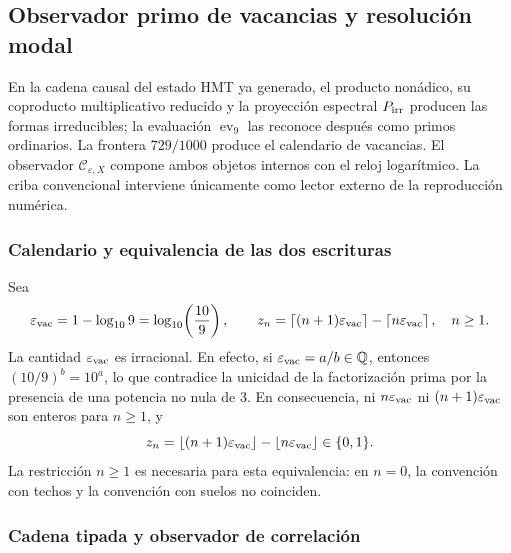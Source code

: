 \subsection{Observador primo de vacancias y resoluci\'on modal}
\label{sec:f051-prime-vacancy-observer}

En la cadena causal del estado HMT ya generado, el producto non\'adico, su
coproducto multiplicativo reducido y la proyecci\'on espectral
\(P_{\rm irr}\) producen las formas irreducibles; la evaluaci\'on
\(\operatorname{ev}_9\) las reconoce despu\'es como primos ordinarios. La
frontera \(729/1000\) produce el calendario de vacancias. El observador
\(\mathcal C_{\varepsilon,X}\) compone ambos objetos internos con el reloj
logar\'itmico. La criba convencional interviene únicamente como lector
externo de la reproducci\'on num\'erica.

\subsubsection{Calendario y equivalencia de las dos escrituras}

Sea
\begin{equation}
 \varepsilon_{\rm vac}
 =1-\log_{10}9
 =\log_{10}\!\left(\frac{10}{9}\right),
 \qquad
 z_n=\left\lceil(n+1)\varepsilon_{\rm vac}\right\rceil
      -\left\lceil n\varepsilon_{\rm vac}\right\rceil ,
 \quad n\geq1.
 \label{eq:f051-epsilon-calendar}
\end{equation}
La cantidad \(\varepsilon_{\rm vac}\) es irracional. En efecto, si
\(\varepsilon_{\rm vac}=a/b\in\mathbb Q\), entonces
\((10/9)^b=10^a\), lo que contradice la unicidad de la factorizaci\'on
prima por la presencia de una potencia no nula de \(3\). En consecuencia,
ni \(n\varepsilon_{\rm vac}\) ni
\((n+1)\varepsilon_{\rm vac}\) son enteros para \(n\geq1\), y
\begin{equation}
 z_n=\left\lfloor(n+1)\varepsilon_{\rm vac}\right\rfloor
      -\left\lfloor n\varepsilon_{\rm vac}\right\rfloor
 \in\{0,1\}.
 \label{eq:f051-ceil-floor}
\end{equation}
La restricci\'on \(n\geq1\) es necesaria para esta equivalencia: en
\(n=0\), la convenci\'on con techos y la convenci\'on con suelos no coinciden.

\subsubsection{Cadena tipada y observador de correlaci\'on}

